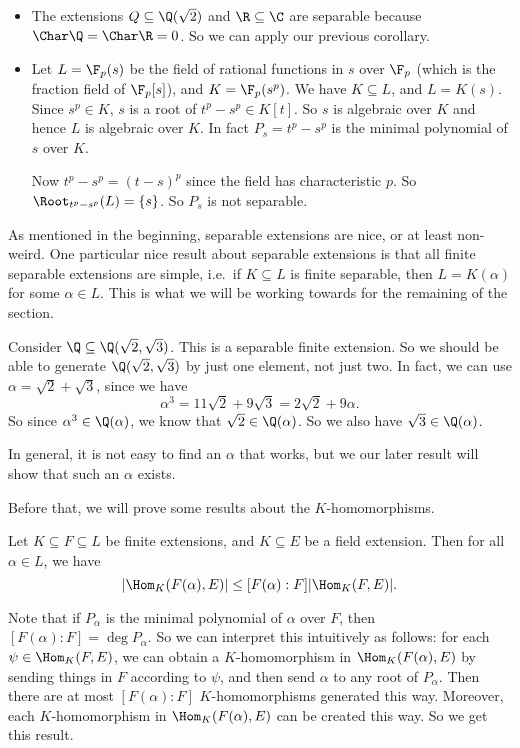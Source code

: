\documentclass[a4paper]{article}
\begin{document}
\begin{eg}\leavevmode
  \begin{itemize}
    \item The extensions $Q \subseteq \Q(\sqrt{2})$ and $\R \subseteq \C$ are separable because $\Char \Q = \Char \R = 0$. So we can apply our previous corollary.
    \item Let $L = \F_p(s)$ be the field of rational functions in $s$ over $\F_p$ (which is the fraction field of $\F_p[s]$), and $K = \F_p(s^p)$. We have $K \subseteq L$, and $L = K(s)$. Since $s^p \in K$, $s$ is a root of $t^p - s^p \in K[t]$. So $s$ is algebraic over $K$ and hence $L$ is algebraic over $K$. In fact $P_s = t^p - s^p$ is the minimal polynomial of $s$ over $K$.

      Now $t^p - s^p = (t - s)^p$ since the field has characteristic $p$. So $\Root_{t^p - s^p}(L) = \{s\}$. So $P_s$ is not separable.
  \end{itemize}
\end{eg}
As mentioned in the beginning, separable extensions are nice, or at least non-weird. One particular nice result about separable extensions is that all finite separable extensions are simple, i.e.\ if $K \subseteq L$ is finite separable, then $L = K(\alpha)$ for some $\alpha \in L$. This is what we will be working towards for the remaining of the section.

\begin{eg}
  Consider $\Q \subseteq \Q(\sqrt{2}, \sqrt{3})$. This is a separable finite extension. So we should be able to generate $\Q(\sqrt{2}, \sqrt{3})$ by just one element, not just two. In fact, we can use $\alpha = \sqrt{2} + \sqrt{3}$, since we have
  \[
    \alpha^3 = 11\sqrt{2} + 9\sqrt{3} = 2\sqrt{2} + 9 \alpha.
  \]
  So since $\alpha^3 \in \Q(\alpha)$, we know that $\sqrt{2} \in \Q(\alpha)$. So we also have $\sqrt{3} \in \Q(\alpha)$.
\end{eg}
In general, it is not easy to find an $\alpha$ that works, but we our later result will show that such an $\alpha$ exists.

Before that, we will prove some results about the $K$-homomorphisms.
\begin{lemma}
  Let $K\subseteq F\subseteq L$ be finite extensions, and $K\subseteq E$ be a field extension. Then for all $\alpha \in L$, we have
  \[
    |\Hom_K(F(\alpha), E)| \leq [F(\alpha): F] |\Hom_K(F, E)|.
  \]
\end{lemma}
Note that if $P_\alpha$ is the minimal polynomial of $\alpha$ over $F$, then $[F(\alpha): F] = \deg P_\alpha$. So we can interpret this intuitively as follows: for each $\psi \in \Hom_K(F, E)$, we can obtain a $K$-homomorphism in $\Hom_K(F(\alpha), E)$ by sending things in $F$ according to $\psi$, and then send $\alpha$ to any root of $P_\alpha$. Then there are at most $[F(\alpha): F]$ $K$-homomorphisms generated this way. Moreover, each $K$-homomorphism in $\Hom_K(F(\alpha), E)$ can be created this way. So we get this result.
\end{document}
